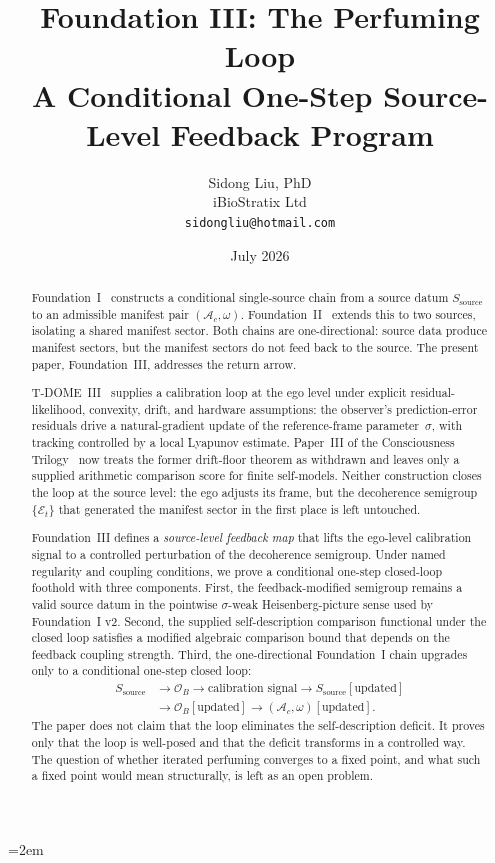 \documentclass[12pt]{article}
\title{%
  \textbf{Foundation III: The Perfuming Loop}\\
  \textbf{A Conditional One-Step Source-Level Feedback Program}%
}
\author{
  Sidong Liu, PhD \\
  \small iBioStratix Ltd \\
  \small \texttt{sidongliu@hotmail.com}
}
\date{July 2026}
\theoremstyle{definition}
\theoremstyle{remark}
\begin{document}
\emergencystretch=2em
\raggedbottom
{}

\maketitle

\begin{abstract}
Foundation~I~\cite{FoundationI} constructs a conditional single-source
chain from a source datum \(S_{\mathrm{source}}\) to an admissible
manifest pair \((\mathcal A_c,\omega)\). Foundation~II~\cite{FoundationII}
extends this to two sources, isolating a shared manifest sector. Both
chains are one-directional: source data produce manifest sectors, but
the manifest sectors do not feed back to the source. The present paper,
Foundation~III, addresses the return arrow.

T-DOME~III~\cite{TDOMEIII} supplies a calibration loop at the ego level
under explicit residual-likelihood, convexity, drift, and hardware
assumptions: the observer's prediction-error residuals drive a
natural-gradient update of the reference-frame parameter~\(\sigma\),
with tracking controlled by a local Lyapunov estimate. Paper~III of the
Consciousness Trilogy~\cite{PaperIII} now treats the former
drift-floor theorem as withdrawn and leaves only a supplied arithmetic
comparison score for finite self-models. Neither construction closes the
loop at the source level: the ego adjusts its frame, but the decoherence
semigroup \(\{\mathcal E_t\}\) that generated the manifest sector in the
first place is left untouched.

Foundation~III defines a \emph{source-level feedback map} that lifts the
ego-level calibration signal to a controlled perturbation of the
decoherence semigroup. Under named regularity and coupling conditions,
we prove a conditional one-step closed-loop foothold with three
components. First, the feedback-modified semigroup remains a valid
source datum in the pointwise \(\sigma\)-weak Heisenberg-picture sense
used by Foundation~I v2. Second, the supplied self-description
comparison functional under the closed loop satisfies a modified
algebraic comparison bound that depends on the feedback coupling
strength. Third, the one-directional Foundation~I chain
upgrades only to a conditional one-step closed loop:
\[
\begin{aligned}
S_{\mathrm{source}}
&\longrightarrow
\mathcal O_B
\longrightarrow
\text{calibration signal}
\longrightarrow
S_{\mathrm{source}}[\text{updated}]\\
&\longrightarrow
\mathcal O_B[\text{updated}]
\longrightarrow
(\mathcal A_c,\omega)[\text{updated}].
\end{aligned}
\]
The paper does not claim that the loop eliminates the self-description
deficit. It proves only that the loop is well-posed and that the deficit
transforms in a controlled way. The question of whether iterated
perfuming converges to a fixed point, and what such a fixed point would
mean structurally, is left as an open problem.
 \end{abstract}
\end{document}
